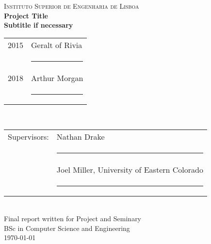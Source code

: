 \begin{center}
    \textsc{\LARGE Instituto Superior de Engenharia de Lisboa}\\[30mm]

    {\HUGE \textbf{Project Title}}\\[15mm]

    {\huge \textbf{Subtitle if necessary}}\\[25mm]

    \begin{tabular}{rl}
        2015 & Geralt of Rivia\\[10mm]
        & \rule{75mm}{0.5pt}\\[5mm]
        2018 & Arthur Morgan\\[10mm]
        & \rule{75mm}{0.5pt} \\
    \end{tabular}\\[10mm]

    \begin{tabular}{rl}
        Supervisors: & Nathan Drake\\[10mm]
        & \rule{75mm}{0.5pt}\\[5mm]
        & Joel Miller, University of Eastern Colorado\\[10mm]
        & \rule{75mm}{0.5pt} \\
    \end{tabular}\\[10mm]

    Final report written for Project and Seminary\\
    BSc in Computer Science and Engineering\\[20mm]

    \today
\end{center}
